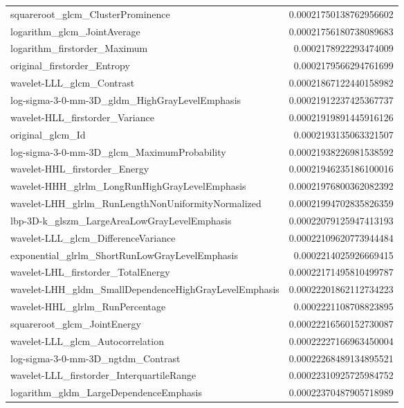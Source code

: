 {\begin{xltabular}[H]{\textwidth}{X r}
        squareroot\_glcm\_ClusterProminence & 0.00021750138762956602 \\
        logarithm\_glcm\_JointAverage & 0.00021756180738089683 \\
        logarithm\_firstorder\_Maximum & 0.0002178922293474009 \\
        original\_firstorder\_Entropy & 0.0002179566294761699 \\
        wavelet-LLL\_glcm\_Contrast & 0.00021867122440158982 \\
        log-sigma-3-0-mm-3D\_gldm\_HighGrayLevelEmphasis & 0.00021912237425367737 \\
        wavelet-HLL\_firstorder\_Variance & 0.00021919891445916126 \\
        original\_glcm\_Id & 0.0002193135063321507 \\
        log-sigma-3-0-mm-3D\_glcm\_MaximumProbability & 0.00021938226981538592 \\
        wavelet-HHL\_firstorder\_Energy & 0.00021946235186100016 \\
        wavelet-HHH\_glrlm\_LongRunHighGrayLevelEmphasis & 0.00021976800362082392 \\
        wavelet-LHH\_glrlm\_RunLengthNonUniformityNormalized & 0.00021994702835826359 \\
        lbp-3D-k\_glszm\_LargeAreaLowGrayLevelEmphasis & 0.00022079125947413193 \\
        wavelet-LLL\_glcm\_DifferenceVariance & 0.00022109620773944484 \\
        exponential\_glrlm\_ShortRunLowGrayLevelEmphasis & 0.0002214025926669415 \\
        wavelet-LHL\_firstorder\_TotalEnergy & 0.00022171495810499787 \\
        wavelet-LHH\_gldm\_SmallDependenceHighGrayLevelEmphasis & 0.00022201862112734223 \\
        wavelet-HHL\_glrlm\_RunPercentage & 0.0002221108708823895 \\
        squareroot\_glcm\_JointEnergy & 0.00022216560152730087 \\
        wavelet-LLL\_glcm\_Autocorrelation & 0.00022227166963450004 \\
        log-sigma-3-0-mm-3D\_ngtdm\_Contrast & 0.00022268489134895521 \\
        wavelet-LLL\_firstorder\_InterquartileRange & 0.00022310925725984752 \\
        logarithm\_gldm\_LargeDependenceEmphasis & 0.00022370487905718989 \\

\end{xltabular}}
